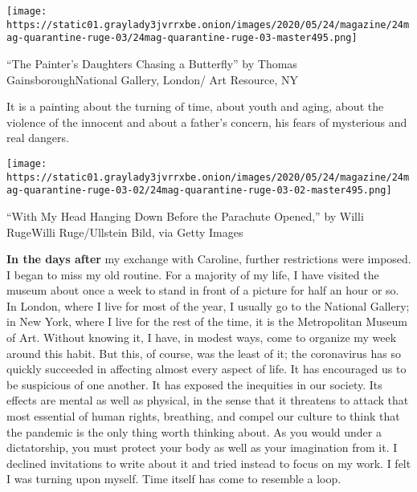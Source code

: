 \texttt{[image: https://static01.graylady3jvrrxbe.onion/images/2020/05/24/magazine/24mag-quarantine-ruge-03/24mag-quarantine-ruge-03-master495.png]}

``The Painter's Daughters Chasing a Butterfly'' by Thomas
GainsboroughNational Gallery, London/ Art Resource, NY

It is a painting about the turning of time, about youth and aging, about
the violence of the innocent and about a father's concern, his fears of
mysterious and real dangers.

\texttt{[image: https://static01.graylady3jvrrxbe.onion/images/2020/05/24/magazine/24mag-quarantine-ruge-03-02/24mag-quarantine-ruge-03-02-master495.png]}

``With My Head Hanging Down Before the Parachute Opened,'' by Willi
RugeWilli Ruge/Ullstein Bild, via Getty Images

\textbf{In the days after} my exchange with Caroline, further
restrictions were imposed. I began to miss my old routine. For a
majority of my life, I have visited the museum about once a week to
stand in front of a picture for half an hour or so. In London, where I
live for most of the year, I usually go to the National Gallery; in New
York, where I live for the rest of the time, it is the Metropolitan
Museum of Art. Without knowing it, I have, in modest ways, come to
organize my week around this habit. But this, of course, was the least
of it; the coronavirus has so quickly succeeded in affecting almost
every aspect of life. It has encouraged us to be suspicious of one
another. It has exposed the inequities in our society. Its effects are
mental as well as physical, in the sense that it threatens to attack
that most essential of human rights, breathing, and compel our culture
to think that the pandemic is the only thing worth thinking about. As
you would under a dictatorship, you must protect your body as well as
your imagination from it. I declined invitations to write about it and
tried instead to focus on my work. I felt I was turning upon myself.
Time itself has come to resemble a loop.

